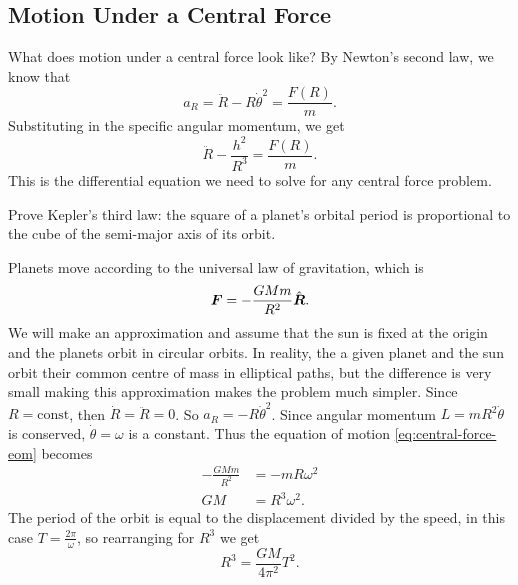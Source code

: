 \documentclass[../classical_mechanics.tex]{subfiles}
\begin{document}
        \subsection{Motion Under a Central Force}\label{subsec:motion-under-a-central-force}
            What does motion under a central force look like?
            By Newton's second law, we know that
            \begin{equation}\label{eq:central-force-eom}
                a_R=\ddot{R}-R\dot{\theta}^2=\frac{F(R)}{m}.
            \end{equation}
            Substituting in the specific angular momentum, we get
            \begin{equation}
                \ddot{R}-\frac{h^2}{R^3}=\frac{F(R)}{m}.
            \end{equation}
            This is the differential equation we need to solve for any central force problem.
            \begin{example}
                Prove Kepler's third law: the square of a planet's orbital period is proportional to the cube of the semi-major axis of its orbit.

                Planets move according to the universal law of gravitation, which is
                \begin{equation}
                    \boldsymbol{F}=-\frac{GMm}{R^2}\hat{\boldsymbol{R}}.
                \end{equation}
                We will make an approximation and assume that the sun is fixed at the origin and the planets orbit in circular orbits.
                In reality, the a given planet and the sun orbit their common centre of mass in elliptical paths, but the difference is very small making this approximation makes the problem much simpler.
                Since $R=\text{const}$, then $\dot{R}=\ddot{R}=0$.
                So $a_R=-R\dot{\theta}^2$.
                Since angular momentum $L=mR^2\dot{\theta}$ is conserved, $\dot{\theta}=\omega$ is a constant.
                Thus the equation of motion \ref{eq:central-force-eom} becomes
                \begin{align}
                    -\frac{GMm}{R^2}&=-mR\omega^2\\
                    GM&=R^3\omega^2.
                \end{align}
                The period of the orbit is equal to the displacement divided by the speed, in this case $T=\frac{2\pi}{\omega}$, so rearranging for $R^3$ we get
                \begin{equation}
                    R^3=\frac{GM}{4\pi^2}T^2.
                \end{equation}
            \end{example}
\end{document}
